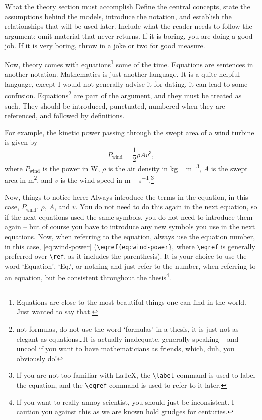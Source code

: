 \documentclass[masters,en,listoffigures,listoftables,acronyms]{NMBU}
\begin{document}
\begin{thesispoint}{What the theory section must accomplish}
Define the central concepts, state the assumptions behind the models, introduce the notation, and establish the relationships that will be used later. 
Include what the reader needs to follow the argument; omit material that never returns.
If it is boring, you are doing a good job.
If it is very boring, throw in a joke or two for good measure.
\end{thesispoint}

Now, theory comes with equations\footnote{Equations are close to the most beautiful things one can find in the world. Just wanted to say that.} some of the time.
Equations are sentences in another notation.
Mathematics is just another language.
It is a quite helpful language, except I would not generally advise it for dating, it can lead to some confusion.
Equations\footnote{not formulas, do not use the word `formulas' in a thesis, it is just not as elegant as equations\dots It is actually inadequate, generally speaking -- and uncool if you want to have mathematicians as friends, which, duh, you obviously do!} are part of the argument, and they must be treated as such.
They should be introduced, punctuated, numbered when they are referenced, and followed by definitions.

For example, the kinetic power passing through the swept area of a wind turbine is given by
%
\begin{equation}
P_\mathrm{wind} = \frac{1}{2}\rho A v^{3}, \label{eq:wind-power}
\end{equation}
%
where \(P_\mathrm{wind}\) is the power in \unit{W}, \(\rho\) is the air density in \unit{kg\,m^{-3}}, \(A\) is the swept area in \unit{m^{2}}, and \(v\) is the wind speed in \unit{m\,s^{-1}}.\footnote{If you are not too familiar with \LaTeX, the \texttt{\textbackslash label} command is used to label the equation, and the \texttt{\textbackslash eqref} command is used to refer to it later.}

Now, things to notice here: Always introduce the terms in the equation, in this case, \(P_\mathrm{wind}\), \(\rho\), \(A\), and \(v\).
You do not need to do this again in the next equation, so if the next equations used the same symbols, you do not need to introduce them again -- but of course you have to introduce any new symbols you use in the next equations.
Now, when referring to the equation, always use the equation number, in this case, \eqref{eq:wind-power} (\verb|\eqref{eq:wind-power}|, where \verb|\eqref| is generally preferred over \verb|\ref|, as it includes the parenthesis).
It is your choice to use the word `Equation', `Eq.', or nothing and just refer to the number, when referring to an equation, but be consistent throughout the thesis\footnote{If you want to really annoy scientist, you should just be inconsistent. I caution you against this as we are known hold grudges for centuries.}.
\end{document}
